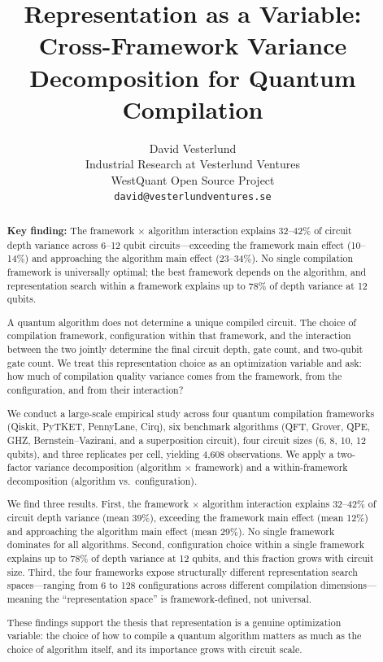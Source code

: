 \documentclass[11pt,a4paper]{article}
\title{\Large\textbf{Representation as a Variable: Cross-Framework Variance Decomposition for Quantum Compilation}}
\author{%
  David Vesterlund \\
  Industrial Research at Vesterlund Ventures \\
  WestQuant Open Source Project \\
  \texttt{david@vesterlundventures.se}%
}
\date{}
\begin{document}
\maketitle
\thispagestyle{empty}


\begin{abstract}
\noindent
\textbf{Key finding:} The framework $\times$ algorithm interaction explains 32--42\% of circuit depth variance across 6--12 qubit circuits---exceeding the framework main effect (10--14\%) and approaching the algorithm main effect (23--34\%). No single compilation framework is universally optimal; the best framework depends on the algorithm, and representation search within a framework explains up to 78\% of depth variance at 12 qubits.

\medskip
\noindent
A quantum algorithm does not determine a unique compiled circuit. The choice of compilation framework, configuration within that framework, and the interaction between the two jointly determine the final circuit depth, gate count, and two-qubit gate count. We treat this representation choice as an optimization variable and ask: how much of compilation quality variance comes from the framework, from the configuration, and from their interaction?

We conduct a large-scale empirical study across four quantum compilation frameworks (Qiskit, PyTKET, PennyLane, Cirq), six benchmark algorithms (QFT, Grover, QPE, GHZ, Bernstein--Vazirani, and a superposition circuit), four circuit sizes (6, 8, 10, 12 qubits), and three replicates per cell, yielding 4{,}608 observations. We apply a two-factor variance decomposition (algorithm $\times$ framework) and a within-framework decomposition (algorithm vs.\ configuration).

We find three results. First, the framework $\times$ algorithm interaction explains 32--42\% of circuit depth variance (mean 39\%), exceeding the framework main effect (mean 12\%) and approaching the algorithm main effect (mean 29\%). No single framework dominates for all algorithms. Second, configuration choice within a single framework explains up to 78\% of depth variance at 12 qubits, and this fraction grows with circuit size. Third, the four frameworks expose structurally different representation search spaces---ranging from 6 to 128 configurations across different compilation dimensions---meaning the ``representation space'' is framework-defined, not universal.

These findings support the thesis that representation is a genuine optimization variable: the choice of how to compile a quantum algorithm matters as much as the choice of algorithm itself, and its importance grows with circuit scale.
\end{abstract}
\end{document}
